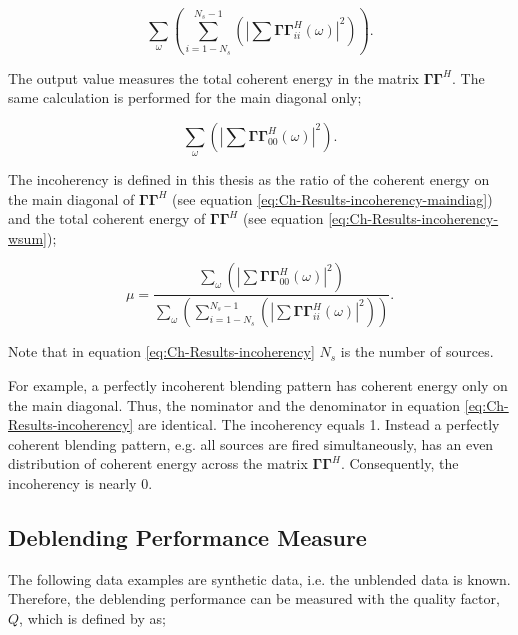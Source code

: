 \begin{equation}
	\sum_{\omega} \left( \sum_{i = 1-N_s}^{N_s-1}	 \left( \left| \sum \mathbf{\Gamma \Gamma}^H_{ii} (\omega) \right|^2 \right) \right).
	\label{eq:Ch-Results-incoherency-wsum}
\end{equation}

 The output value measures the total coherent energy in the matrix $\mathbf{\Gamma \Gamma}^H$. The same calculation is performed for the main diagonal only;
 
 \begin{equation}
 	\sum_{\omega} \left( \left| \sum \mathbf{\Gamma \Gamma}^H_{00} (\omega) \right|^2  \right).
 	\label{eq:Ch-Results-incoherency-maindiag}
 \end{equation} 

 The incoherency is defined in this thesis as the ratio of the coherent energy on the main diagonal of $\mathbf{\Gamma \Gamma}^H$ (see equation \ref{eq:Ch-Results-incoherency-maindiag}) and the total coherent energy of $\mathbf{\Gamma \Gamma}^H$ (see equation \ref{eq:Ch-Results-incoherency-wsum});

\begin{equation}
	\mu = \frac{  \sum_{\omega} \left( \left| \sum \mathbf{\Gamma \Gamma}^H_{00} (\omega) \right|^2  \right)  }{  \sum_{\omega} \left( \sum_{i = 1-N_s}^{N_s-1}	 \left( \left| \sum \mathbf{\Gamma \Gamma}^H_{ii} (\omega) \right|^2 \right) \right)  }.
	\label{eq:Ch-Results-incoherency}
\end{equation}

Note that in equation \ref{eq:Ch-Results-incoherency} $N_s$ is the number of sources.

For example, a perfectly incoherent blending pattern has coherent energy only on the main diagonal. Thus, the nominator and the denominator in equation \ref{eq:Ch-Results-incoherency} are identical. The incoherency equals 1. Instead a perfectly coherent blending pattern, e.g. all sources are fired simultaneously, has an even distribution of coherent energy across the matrix $\mathbf{\Gamma \Gamma}^H$. Consequently, the incoherency is nearly 0.



\subsection*{Deblending Performance Measure}

The following data examples are synthetic data, i.e. the unblended data is known. Therefore, the deblending performance can be measured with the quality factor, $Q$, which is defined by \citet{IbrahimQuality} as;

